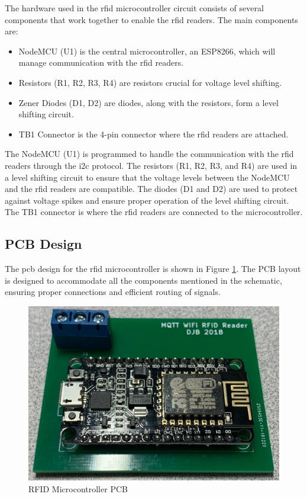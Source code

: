 The hardware used in the \gls{rfid} microcontroller circuit consists of several components that work together to enable the \gls{rfid} readers. The main components are:
\begin{itemize}
\item NodeMCU (U1) is the central microcontroller, an ESP8266, which will manage communication with the \gls{rfid} readers.
\item Resistors (R1, R2, R3, R4) are resistors crucial for voltage level shifting.
\item Zener Diodes (D1, D2) are diodes, along with the resistors, form a level shifting circuit.
\item TB1 Connector is the 4-pin connector where the \gls{rfid} readers are attached.
\end{itemize}
The NodeMCU (U1) is programmed to handle the communication with the \gls{rfid} readers through the \gls{i2c} protocol. The resistors (R1, R2, R3, and R4) are used in a level shifting circuit to ensure that the voltage levels between the 
NodeMCU and the \gls{rfid} readers are compatible. The diodes (D1 and D2) are used to protect against voltage spikes and ensure proper operation of the level shifting circuit. The TB1 connector is where the \gls{rfid} readers are connected to the microcontroller.

\subsection{PCB Design}
The \gls{pcb} design for the \gls{rfid} microcontroller is shown in Figure \ref{fig:rfid_pcb}. The PCB layout is designed to accommodate all the components mentioned in the schematic, ensuring proper 
connections and efficient routing of signals.

\begin{figure}[H]
  \centering
    \includegraphics[scale=0.15]{rfid_pcb.png}
  \caption{RFID Microcontroller PCB}
  \label{fig:rfid_pcb}
\end{figure}
